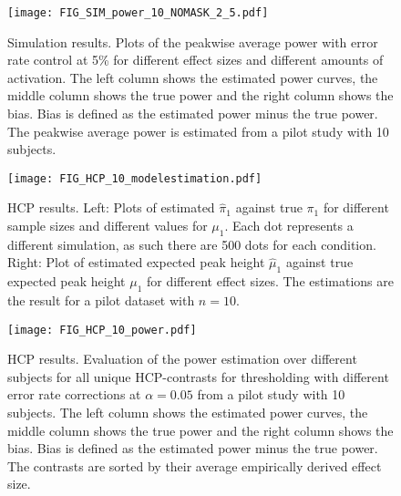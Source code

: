 \begin{center}
\begin{figure}[h]
\texttt{[image: FIG\_SIM\_power\_10\_NOMASK\_2\_5.pdf]}
\caption{Simulation results.  Plots of the peakwise average power with error rate control at 5\% for different effect sizes and different amounts of activation.  The left column shows the estimated power curves, the middle column shows the true power and the right column shows the bias.  Bias is defined as the estimated power minus the true power.  The peakwise average power is estimated from a pilot study with 10 subjects. \label{SIM_pow_10}}
\end{figure}
\end{center}

\begin{center}
\begin{figure}[h]
\texttt{[image: FIG\_HCP\_10\_modelestimation.pdf]}
\caption{HCP results.  Left: Plots of estimated $\hat\pi_1$ against true $\pi_1$ for different sample sizes and different values for $\mu_1$. Each dot represents a different simulation, as such there are 500 dots for each condition.  Right: Plot of estimated expected peak height $\hat\mu_1$ against true expected peak height $\mu_1$ for different effect sizes. The estimations are the result for a pilot dataset with $n=10$.  \label{SIM_model_10}}
\end{figure}
\end{center}


\begin{center}
\begin{figure}[h]
\texttt{[image: FIG\_HCP\_10\_power.pdf]}
\caption{HCP results.  Evaluation of the power estimation over different subjects for all unique HCP-contrasts for thresholding with different error rate corrections at $\alpha=0.05$ from a pilot study with 10 subjects. The left column shows the estimated power curves, the middle column shows the true power and the right column shows the bias.  Bias is defined as the estimated power minus the true power.  The contrasts are sorted by their average empirically derived effect size. \label{SIM_pow_10}}
\end{figure}
\end{center}

\clearpage
